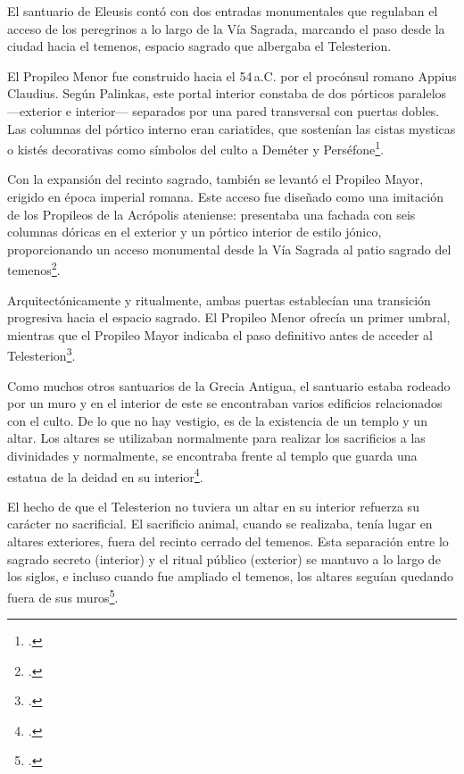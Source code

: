 El santuario de Eleusis contó con dos entradas monumentales que regulaban el acceso de los peregrinos a lo largo de la Vía Sagrada, marcando el paso desde la ciudad hacia el temenos, espacio sagrado que albergaba el Telesterion.

El Propileo Menor fue construido hacia el 54 a.C. por el procónsul romano Appius Claudius. Según Palinkas, este portal interior constaba de dos pórticos paralelos —exterior e interior— separados por una pared transversal con puertas dobles. Las columnas del pórtico interno eran cariatides, que sostenían las cistas mysticas o kistés decorativas como símbolos del culto a Deméter y Perséfone\footcite[175-176]{lynnepalinkasEleusinianGatewaysEntrances2008}.

Con la expansión del recinto sagrado, también se levantó el Propileo Mayor, erigido en época imperial romana. Este acceso fue diseñado como una imitación de los Propileos de la Acrópolis ateniense: presentaba una fachada con seis columnas dóricas en el exterior y un pórtico interior de estilo jónico, proporcionando un acceso monumental desde la Vía Sagrada al patio sagrado del temenos\footcite[180-181]{lynnepalinkasEleusinianGatewaysEntrances2008}.

Arquitectónicamente y ritualmente, ambas puertas establecían una transición progresiva hacia el espacio sagrado. El Propileo Menor ofrecía un primer umbral, mientras que el Propileo Mayor indicaba el paso definitivo antes de acceder al Telesterion\footcite[182-183]{lynnepalinkasEleusinianGatewaysEntrances2008}. 

Como muchos otros santuarios de la Grecia Antigua, el santuario estaba rodeado por un muro y en el interior de este se encontraban varios edificios relacionados con el culto. De lo que no hay vestigio, es de la existencia de un templo y un altar. Los altares se utilizaban normalmente para realizar los sacrificios a las divinidades y normalmente, se encontraba frente al templo que guarda una estatua de la deidad en su interior\footcite[44]{bowdenMysteryCultsAncient2023}. 

El hecho de que el Telesterion no tuviera un altar en su interior refuerza su carácter no sacrificial. El sacrificio animal, cuando se realizaba, tenía lugar en altares exteriores, fuera del recinto cerrado del temenos. Esta separación entre lo sagrado secreto (interior) y el ritual público (exterior) se mantuvo a lo largo de los siglos, e incluso cuando fue ampliado el temenos, los altares seguían quedando fuera de sus muros\footcite[238]{a.evansSanctuariesSacrificesEleusinian2002}.

